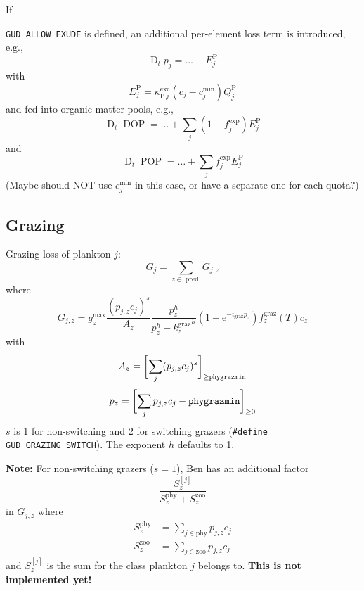 \documentclass[11pt,letterpaper,english]{article}
\def\|#1|{\operatorname{#1}}
\newcommand{\ee}{\mathrm{e}}
\newcommand{\DDt}{\operatorname{D}_t}
\DeclareMathOperator{\DOP}{DOP}
\DeclareMathOperator{\POP}{POP}
\renewcommand{\P}{\mathrm{P}}
\newcommand{\graz}{{\text{graz}}}
\newcommand{\phy}{{\text{phy}}}
\newcommand{\zoo}{{\text{zoo}}}
\newcommand{\X}{c}
\newcommand{\palat}{p}
\begin{document}
If {\verb|GUD_ALLOW_EXUDE| is defined, an additional per-element loss term
is introduced, e.g.,
\[
  \DDt p_j = \dots - E^\P_j
\]
with
\[
  E^\P_j = \kappa^{\|exc|}_{\P\,j} (\X_j - \X_j^{\min}) Q^\P_j
\]
and fed into organic matter pools, e.g.,
\[
  \DDt \DOP = \dots + \sum_j (1 - f^{\exp}_j) E^\P_j
\]
and
\[
  \DDt \POP = \dots + \sum_j f^{\exp}_j E^\P_j
\]
(Maybe should NOT use $\X_j^{\min}$ in this case, or have a separate one for each quota?)



\subsection{Grazing}

Grazing loss of plankton $j$:
\[
  G_j = \sum_{z\in\|pred|} G_{j,z}
\]
where
\[
  G_{j,z} = g^{\max}_z
       \frac{(\palat_{j,z} \X_j)^s}{A_z}
       \frac{p_z^h}{p_z^h + {k^\graz_z}^h}
       (1 - \ee^{-i_\graz p_z})
       f^\graz_z(T)
       \X_z
\]
with
\[
  A_z = \biggl[ \sum_j (\palat_{j,z} \X_j)^s \biggr]_{\ge\tt phygrazmin}
\]
\[
  p_z = \biggl[ \sum_j \palat_{j,z} \X_j - {\tt phygrazmin} \biggr]_{\ge 0}
\]
$s$ is 1 for non-switching and 2 for switching grazers (\verb|#define GUD_GRAZING_SWITCH|).
The exponent $h$ defaults to 1.

\textbf{Note:} For non-switching grazers ($s=1$), Ben has an additional factor
\[
  \frac{S^{[j]}_z}{S^\phy_z + S^\zoo_z}
\]
in $G_{j,z}$ where
\begin{align*}
  S^\phy_z &= \sum_{j\in\phy} \palat_{j,z} \X_j
\\
  S^\zoo_z &= \sum_{j\in\zoo} \palat_{j,z} \X_j
\end{align*}
and $S^{[j]}_z$ is the sum for the class plankton $j$ belongs to.
\textbf{This is not implemented yet!}

}
\end{document}
